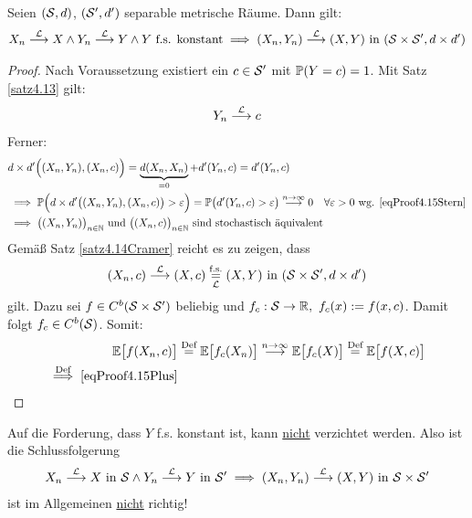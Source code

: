 \pagebreak[4]
\begin{satz}\label{satz4.15CramerSlutsky}\enter
	Seien $(\S,d)$, $(\S',d')$ separable metrische Räume. 
	Dann gilt:
	\begin{align*}
		X_n\stackrel{\L}{\longrightarrow} X\wedge Y_n\stackrel{\L}{\longrightarrow} Y\wedge Y\text{ f.s. konstant}
		\implies (X_n,Y_n)\stackrel{\L}{\longrightarrow}(X,Y)\text{ in }(\S\times\S',d\times d')
	\end{align*}
\end{satz}

\begin{proof}
	Nach Voraussetzung existiert ein $c\in\S'$ mit $\P(Y=c)=1$. 
	Mit Satz \ref{satz4.13} gilt:
	\begin{align}\label{eqProof4.15Stern}
		Y_n\stackrel{\L}{\longrightarrow} c
	\end{align}
	Ferner:
	\begin{align*}
		&d\times d'\Big((X_n,Y_n),(X_n,c)\Big)
		=\underbrace{d(X_n,X_n)}_{=0}+d'(Y_n,c)
		=d'(Y_n,c)\\
		&\implies\P\Big(d\times d'\big((X_n,Y_n),(X_n,c)\big)>\varepsilon\Big)
		=\P\big(d'(Y_n,c)>\varepsilon\big)
		\stackrel{n\to\infty}{\longrightarrow} 0\quad\forall\varepsilon>0\text{ wg. } \eqref{eqProof4.15Stern}\\
		&\implies
		\big((X_n,Y_n)\big)_{n\in\N}\text{ und }\big((X_n,c)\big)_{n\in\N}\text{ sind stochastisch äquivalent}
	\end{align*}
	Gemäß Satz \ref{satz4.14Cramer} reicht es zu zeigen, dass
	\begin{align}\label{eqProof4.15Plus}
		(X_n,c)\stackrel{\L}{\longrightarrow}(X,c)\stackrelnew{\L}{\text{f.s.}}{=}(X,Y)\text{ in }(\S\times\S',d\times d')
	\end{align}
	gilt. 
	Dazu sei $f\in C^b(\S\times\S')$ beliebig und $f_c:\S\to\R,~f_c(x):=f(x,c)$. 
	Damit folgt $f_c\in C^b(\S)$. 
	Somit:
	\begin{align*}
		\E\big[f(X_n,c)\big]
		&\stackeq{\text{Def}}
		\E\big[f_c(X_n)\big]
		\stackrel{n\to\infty}{\longrightarrow}\E\big[f_c(X)\big]\stackeq{\text{Def}}
		\E\big[f(X,c)\big]\\
		\stackrel{\text{Def}}{\implies}
		\eqref{eqProof4.15Plus}
	\end{align*}
\end{proof}

\begin{bemerkungnr}\label{bemerkung4.16} %
	Auf die Forderung, dass $Y$ f.s. konstant ist, kann \underline{nicht} verzichtet werden. 
	Also ist die Schlussfolgerung
	\begin{align*}
		X_n\stackrel{\L}{\longrightarrow} X\text{ in }\S\wedge Y_n\stackrel{\L}{\longrightarrow} Y\text{ in }\S'
		\implies(X_n,Y_n)\stackrel{\L}{\longrightarrow}(X,Y)\text{ in }\S\times\S'
	\end{align*}
	ist im Allgemeinen \underline{nicht} richtig!
\end{bemerkungnr}

